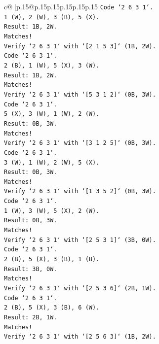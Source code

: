 \documentclass{article}
\begin{document}
{\begin{supertabular}{c@{$\;$}|p{.15\linewidth}@{}p{.15\linewidth}p{.15\linewidth}p{.15\linewidth}p{.15\linewidth}p{.15\linewidth}}
{{{\texttt{Code `2 6 3 1`.} \\
\texttt{1 (W), 2 (W), 3 (B), 5 (X).} \\
\texttt{Result: 1B, 2W.} \\
\texttt{Matches!} \\
\texttt{Verify `2 6 3 1` with `{[}2 1 5 3{]}` (1B, 2W).} \\
\texttt{Code `2 6 3 1`.} \\
\texttt{2 (B), 1 (W), 5 (X), 3 (W).} \\
\texttt{Result: 1B, 2W.} \\
\texttt{Matches!} \\
\texttt{Verify `2 6 3 1` with `{[}5 3 1 2{]}` (0B, 3W).} \\
\texttt{Code `2 6 3 1`.} \\
\texttt{5 (X), 3 (W), 1 (W), 2 (W).} \\
\texttt{Result: 0B, 3W.} \\
\texttt{Matches!} \\
\texttt{Verify `2 6 3 1` with `{[}3 1 2 5{]}` (0B, 3W).} \\
\texttt{Code `2 6 3 1`.} \\
\texttt{3 (W), 1 (W), 2 (W), 5 (X).} \\
\texttt{Result: 0B, 3W.} \\
\texttt{Matches!} \\
\texttt{Verify `2 6 3 1` with `{[}1 3 5 2{]}` (0B, 3W).} \\
\texttt{Code `2 6 3 1`.} \\
\texttt{1 (W), 3 (W), 5 (X), 2 (W).} \\
\texttt{Result: 0B, 3W.} \\
\texttt{Matches!} \\
\texttt{Verify `2 6 3 1` with `{[}2 5 3 1{]}` (3B, 0W).} \\
\texttt{Code `2 6 3 1`.} \\
\texttt{2 (B), 5 (X), 3 (B), 1 (B).} \\
\texttt{Result: 3B, 0W.} \\
\texttt{Matches!} \\
\texttt{Verify `2 6 3 1` with `{[}2 5 3 6{]}` (2B, 1W).} \\
\texttt{Code `2 6 3 1`.} \\
\texttt{2 (B), 5 (X), 3 (B), 6 (W).} \\
\texttt{Result: 2B, 1W.} \\
\texttt{Matches!} \\
\texttt{Verify `2 6 3 1` with `{[}2 5 6 3{]}` (1B, 2W).} \\
}}}
\end{supertabular}}
\end{document}
